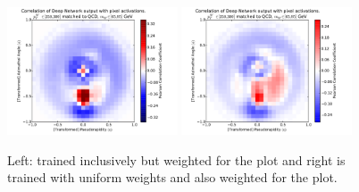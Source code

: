 \begin{figure}[htbp]
  \centering
  \includegraphics[width=0.45\textwidth]{figures/hypercube-pixel-activations-corr.pdf} \includegraphics[width=0.45\textwidth]{figures/ahypercube-pixel-activations-corr.pdf}
  \caption{Left: trained inclusively but weighted for the plot and right is trained with uniform weights and also weighted for the plot.}
  \label{fig:images_hyper}
\end{figure}

